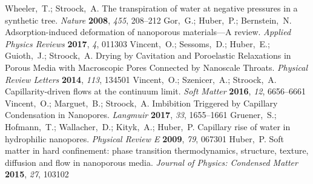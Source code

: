 \documentclass[aps,prl,twocolumn,superscriptaddress,groupedaddress]{revtex4}
\begin{document}
\begin{mcitethebibliography}{88}
Wheeler,~T.; Stroock,~A. The transpiration of water at negative pressures in a
  synthetic tree. \emph{Nature} \textbf{2008}, \emph{455}, 208--212\relax
\mciteBstWouldAddEndPuncttrue
\mciteSetBstMidEndSepPunct{\mcitedefaultmidpunct}
{\mcitedefaultendpunct}{\mcitedefaultseppunct}\relax
\EndOfBibitem
{}
Gor,~G.; Huber,~P.; Bernstein,~N. Adsorption-induced deformation of nanoporous
  materials—A review. \emph{Applied Physics Reviews} \textbf{2017}, \emph{4},
  011303\relax
\mciteBstWouldAddEndPuncttrue
\mciteSetBstMidEndSepPunct{\mcitedefaultmidpunct}
{\mcitedefaultendpunct}{\mcitedefaultseppunct}\relax
\EndOfBibitem
{}
Vincent,~O.; Sessoms,~D.; Huber,~E.; Guioth,~J.; Stroock,~A. Drying by
  Cavitation and Poroelastic Relaxations in Porous Media with Macroscopic Pores
  Connected by Nanoscale Throats. \emph{Physical Review Letters} \textbf{2014},
  \emph{113}, 134501\relax
\mciteBstWouldAddEndPuncttrue
\mciteSetBstMidEndSepPunct{\mcitedefaultmidpunct}
{\mcitedefaultendpunct}{\mcitedefaultseppunct}\relax
\EndOfBibitem
{}
Vincent,~O.; Szenicer,~A.; Stroock,~A. Capillarity-driven flows at the
  continuum limit. \emph{Soft Matter} \textbf{2016}, \emph{12},
  6656--6661\relax
\mciteBstWouldAddEndPuncttrue
\mciteSetBstMidEndSepPunct{\mcitedefaultmidpunct}
{\mcitedefaultendpunct}{\mcitedefaultseppunct}\relax
\EndOfBibitem
{}
Vincent,~O.; Marguet,~B.; Stroock,~A. Imbibition Triggered by Capillary
  Condensation in Nanopores. \emph{Langmuir} \textbf{2017}, \emph{33},
  1655--1661\relax
\mciteBstWouldAddEndPuncttrue
\mciteSetBstMidEndSepPunct{\mcitedefaultmidpunct}
{\mcitedefaultendpunct}{\mcitedefaultseppunct}\relax
\EndOfBibitem
{}
Gruener,~S.; Hofmann,~T.; Wallacher,~D.; Kityk,~A.; Huber,~P. Capillary rise of
  water in hydrophilic nanopores. \emph{Physical Review E} \textbf{2009},
  \emph{79}, 067301\relax
\mciteBstWouldAddEndPuncttrue
\mciteSetBstMidEndSepPunct{\mcitedefaultmidpunct}
{\mcitedefaultendpunct}{\mcitedefaultseppunct}\relax
\EndOfBibitem
{}
Huber,~P. Soft matter in hard confinement: phase transition thermodynamics,
  structure, texture, diffusion and flow in nanoporous media. \emph{Journal of
  Physics: Condensed Matter} \textbf{2015}, \emph{27}, 103102\relax

\end{mcitethebibliography}
\end{document}
